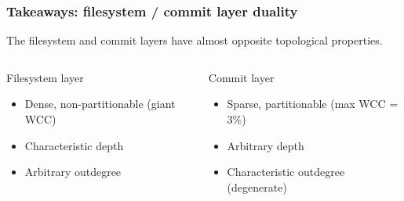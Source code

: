 \documentclass[aspectratio=169,xcolor=table]{beamer}
\begin{document}
    \begin{frame}
        \frametitle{Takeaways: filesystem / commit layer duality}

        \begin{block}{}
            The filesystem and commit layers have almost opposite topological
            properties.
        \end{block}

        \begin{columns}
            \begin{block}{Filesystem layer}
                \begin{itemize}
                    \item Dense, non-partitionable (giant WCC)
                    \item Characteristic depth
                    \item Arbitrary outdegree
                \end{itemize}
                \begin{center}
                    \scalebox{0.7}{}
                \end{center}
            \end{block}

            \begin{block}{Commit layer}
                \begin{itemize}
                    \item Sparse, partitionable (max WCC = 3\%)
                    \item Arbitrary depth
                    \item Characteristic outdegree (degenerate)
                \end{itemize}
                \begin{center}
                    \scalebox{0.5}{}
                \end{center}
            \end{block}
        \end{columns}
    \end{frame}
\end{document}

